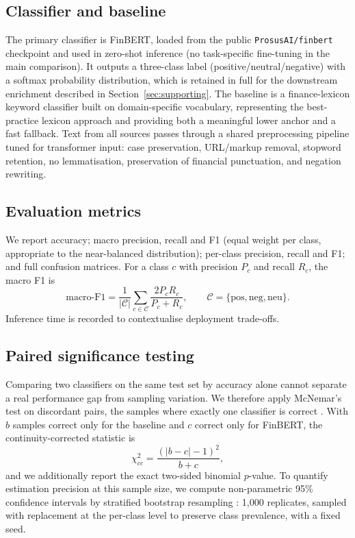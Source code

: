 \documentclass[12pt,a4paper]{article}
\begin{document}
\subsection{Classifier and baseline}
The primary classifier is FinBERT, loaded from the public \texttt{ProsusAI/finbert}
checkpoint and used in zero-shot inference (no task-specific fine-tuning in the main
comparison). It outputs a three-class label (positive/neutral/negative) with a
softmax probability distribution, which is retained in full for the downstream
enrichment described in Section~\ref{sec:supporting}. The baseline is a
finance-lexicon keyword classifier built on domain-specific vocabulary,
representing the best-practice lexicon approach \citep[cf.][]{loughran2011} and
providing both a meaningful lower anchor and a fast fallback. Text from all sources
passes through a shared preprocessing pipeline tuned for transformer input: case
preservation, URL/markup removal, stopword retention, no lemmatisation, preservation
of financial punctuation, and negation rewriting.

\subsection{Evaluation metrics}
We report accuracy; macro precision, recall and F1 (equal weight per class,
appropriate to the near-balanced distribution); per-class precision, recall and F1;
and full confusion matrices. For a class $c$ with precision $P_c$ and recall $R_c$,
the macro F1 is
\begin{equation}
\text{macro-F1} = \frac{1}{|\mathcal{C}|}\sum_{c\in\mathcal{C}}
\frac{2 P_c R_c}{P_c + R_c}, \qquad \mathcal{C}=\{\text{pos},\text{neg},\text{neu}\}.
\end{equation}
Inference time is recorded to contextualise deployment trade-offs.

\subsection{Paired significance testing}\label{sec:sigtest}
Comparing two classifiers on the same test set by accuracy alone cannot separate a
real performance gap from sampling variation. We therefore apply McNemar's test on
discordant pairs, the samples where exactly one classifier is correct
\citep{dietterich1998}. With $b$ samples correct only for the baseline and $c$
correct only for FinBERT, the continuity-corrected statistic is
\begin{equation}
\chi^2_{cc} = \frac{(|b-c|-1)^2}{b+c},
\end{equation}
and we additionally report the exact two-sided binomial $p$-value. To quantify
estimation precision at this sample size, we compute non-parametric 95\% confidence
intervals by stratified bootstrap resampling \citep{efron1993}: 1{,}000 replicates,
sampled with replacement at the per-class level to preserve class prevalence, with a
fixed seed.
\end{document}
